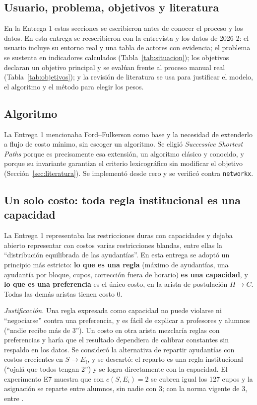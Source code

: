 \documentclass{article}
\begin{document}
\subsection{Usuario, problema, objetivos y literatura}
En la Entrega 1 estas secciones se escribieron antes de conocer el proceso y los datos. En esta entrega se reescribieron con la entrevista y los datos de 2026-2: el usuario incluye su entorno real y una tabla de actores con evidencia; el problema se sustenta en indicadores calculados (Tabla~\ref{tab:situacion}); los objetivos declaran un objetivo principal y se evalúan frente al proceso manual real (Tabla~\ref{tab:objetivos}); y la revisión de literatura se usa para justificar el modelo, el algoritmo y el método para elegir los pesos.

\subsection{Algoritmo}
La Entrega 1 mencionaba Ford--Fulkerson como base y la necesidad de extenderlo a flujo de costo mínimo, sin escoger un algoritmo. Se eligió \textit{Successive Shortest Paths} porque es precisamente esa extensión, un algoritmo clásico y conocido, y porque su invariante garantiza el criterio lexicográfico sin modificar el objetivo (Sección~\ref{sec:literatura}). Se implementó desde cero y se verificó contra \texttt{networkx}.

\subsection{Un solo costo: toda regla institucional es una capacidad}
La Entrega 1 representaba las restricciones duras con capacidades y dejaba abierto representar con costos varias restricciones blandas, entre ellas la ``distribución equilibrada de las ayudantías''. En esta entrega se adoptó un principio más estricto: \textbf{lo que es una regla} (máximo de ayudantías, una ayudantía por bloque, cupos, corrección fuera de horario) \textbf{es una capacidad}, y \textbf{lo que es una preferencia} es el único costo, en la arista de postulación $H \to C$. Todas las demás aristas tienen costo 0.

\emph{Justificación.} Una regla expresada como capacidad no puede violarse ni ``negociarse'' contra una preferencia, y es fácil de explicar a profesores y alumnos (``nadie recibe más de 3''). Un costo en otra arista mezclaría reglas con preferencias y haría que el resultado dependiera de calibrar constantes sin respaldo en los datos. Se consideró la alternativa de repartir ayudantías con costos crecientes en $S \to E_i$, y se descartó: el reparto es una regla institucional (``ojalá que todos tengan 2'') y se logra directamente con la capacidad. El experimento E7 muestra que con $c(S, E_i) = 2$ se cubren igual los 127 cupos y la asignación se reparte entre \capDosAlumnos{} alumnos, sin nadie con 3; con la norma vigente de 3, entre \fAlumnos.
\end{document}
